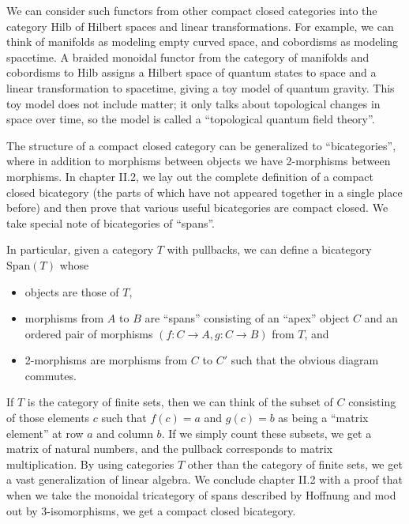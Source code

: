 \documentclass[12pt,twoside,openright]{report}
\newcommand{\Span}{\mbox{Span}}
\begin{document}
We can consider such functors from other compact closed categories into the category Hilb of Hilbert spaces and linear transformations.  For example, we can think of manifolds as modeling empty curved space, and cobordisms as modeling spacetime.  A braided monoidal functor from the category of manifolds and cobordisms to Hilb assigns a Hilbert space of quantum states to space and a linear transformation to spacetime, giving a toy model of quantum gravity.  This toy model does not include matter; it only talks about topological changes in space over time, so the model is called a ``topological quantum field theory''.

The structure of a compact closed category can be generalized to ``bicategories'', where in addition to morphisms between objects we have 2-morphisms between morphisms.  In chapter II.2, we lay out the complete definition of a compact closed bicategory (the parts of which have not appeared together in a single place before) and then prove that various useful bicategories are compact closed.  We take special note of bicategories of ``spans''.

In particular, given a category $T$ with pullbacks, we can define a bicategory $\Span(T)$ whose
\begin{itemize}
  \item objects are those of $T$,
  \item morphisms from $A$ to $B$ are ``spans'' consisting of an ``apex'' object $C$ and an ordered pair of morphisms $(f:C\to A, g:C \to B)$ from $T$, and
  \item 2-morphisms are morphisms from $C$ to $C'$ such that the obvious diagram commutes.
\end{itemize}
If $T$ is the category of finite sets, then we can think of the subset of $C$ consisting of those elements $c$ such that $f(c) = a$ and $g(c) = b$ as being a ``matrix element'' at row $a$ and column $b$.  If we simply count these subsets, we get a matrix of natural numbers, and the pullback corresponds to matrix multiplication.  By using categories $T$ other than the category of finite sets, we get a vast generalization of linear algebra.  We conclude chapter II.2 with a proof that when we take the monoidal tricategory of spans described by Hoffnung \cite{Hoffnung} and mod out by 3-isomorphisms, we get a compact closed bicategory.
\end{document}

